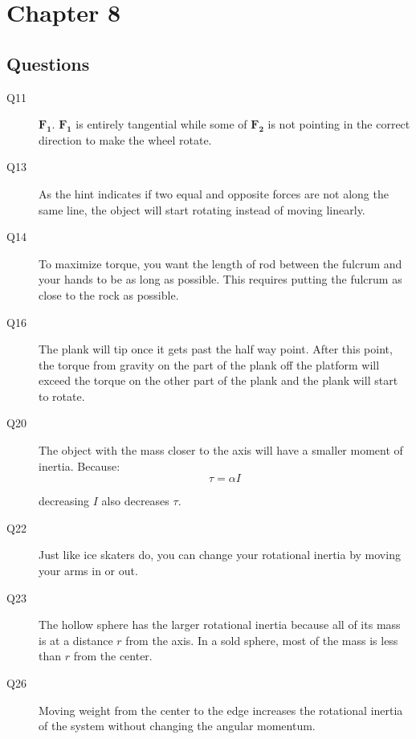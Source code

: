 \documentclass{exam}
\begin{document}
\ifprintanswers

\section{Chapter 8}

\subsection{Questions}

\begin{description}

\item[Q11]
$\mathbf{F_1}$. $\mathbf{F_1}$ is entirely tangential while some of $\mathbf{F_2}$ is not pointing in the correct direction to make the wheel rotate.

\item[Q13]
As the hint indicates if two equal and opposite forces are not along the same line, the object will start rotating instead of moving linearly.

\item[Q14]
To maximize torque, you want the length of rod between the fulcrum and your hands to be as long as possible.  This
requires putting the fulcrum as close to the rock as possible.

\item[Q16]
The plank will tip once it gets past the half way point.  After this point, the torque from gravity on the part of the plank off the
platform will exceed the torque on the other part of the plank and the plank will start to rotate.

\item[Q20]
The object with the mass closer to the axis will have a smaller moment of inertia.  Because:
\[
  \tau = \alpha I
\]

decreasing $I$ also decreases $\tau$.

\item[Q22]
Just like ice skaters do, you can change your rotational inertia by moving your arms in or out.

\item[Q23]
The hollow sphere has the larger rotational inertia because all of its mass is at a distance $r$ from the axis.  In a
sold sphere, most of the mass is less than $r$ from the center.

\item[Q26]
Moving weight from the center to the edge increases the rotational inertia of the system without changing the angular
momentum.  


\end{description}
\end{document}
